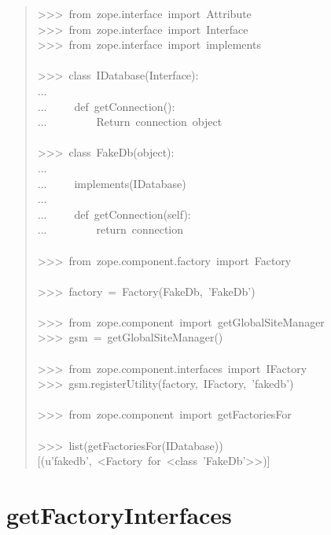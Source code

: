 \documentclass[a4paper,openany,twoside,final]{book}
\begin{document}
\begin{quote}{\ttfamily \raggedright \noindent
>{}>{}>~from~zope.interface~import~Attribute\\
>{}>{}>~from~zope.interface~import~Interface\\
>{}>{}>~from~zope.interface~import~implements\\
~\\
>{}>{}>~class~IDatabase(Interface):\\
...\\
...~~~~~def~getConnection():\\
...~~~~~~~~~\textquotedbl{}\textquotedbl{}\textquotedbl{}Return~connection~object\textquotedbl{}\textquotedbl{}\textquotedbl{}\\
~\\
>{}>{}>~class~FakeDb(object):\\
...\\
...~~~~~implements(IDatabase)\\
...\\
...~~~~~def~getConnection(self):\\
...~~~~~~~~~return~\textquotedbl{}connection\textquotedbl{}\\
~\\
>{}>{}>~from~zope.component.factory~import~Factory\\
~\\
>{}>{}>~factory~=~Factory(FakeDb,~'FakeDb')\\
~\\
>{}>{}>~from~zope.component~import~getGlobalSiteManager\\
>{}>{}>~gsm~=~getGlobalSiteManager()\\
~\\
>{}>{}>~from~zope.component.interfaces~import~IFactory\\
>{}>{}>~gsm.registerUtility(factory,~IFactory,~'fakedb')\\
~\\
>{}>{}>~from~zope.component~import~getFactoriesFor\\
~\\
>{}>{}>~list(getFactoriesFor(IDatabase))\\
{[}(u'fakedb',~<Factory~for~<class~'FakeDb'>{}>){]}
}
\end{quote}


\section*{getFactoryInterfaces%
  \label{getfactoryinterfaces}%
}
\end{document}
